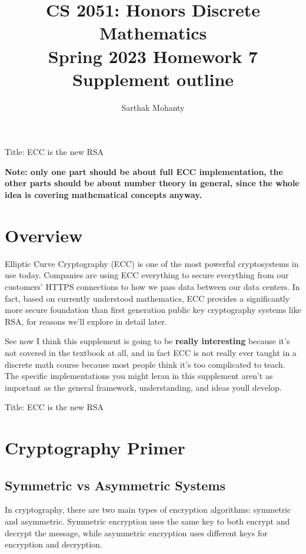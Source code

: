 \documentclass{article}
\title{\vspace{-1cm}CS 2051: Honors Discrete Mathematics \\Spring 2023 Homework 7 Supplement outline}
\author{Sarthak Mohanty }
\date{}
\begin{document}
\maketitle


Title: ECC is the new RSA

\textbf{Note: only one part should be about full ECC implementation, the other parts should be about number theory in general, since the whole idea is covering mathematical concepts anyway.}

\section*{Overview}

Elliptic Curve Cryptography (ECC) is one of the most powerful cryptosystems in use today. Companies are using ECC everything to secure everything from our customers' HTTPS connections to how we pass data between our data centers. In fact, based on currently understood mathematics, ECC provides a significantly more secure foundation than first generation public key cryptography systems like RSA, for reasons we'll explore in detail later.

\vspace{2mm}
See now I think this supplement is going to be \textbf{really interesting} because it's not covered in the textbook at all, and in fact ECC is not really ever taught in a discrete math course because most people think it's too complicated to teach. The specific implementations you might leran in this supplement aren't as important as the general framework, understanding, and ideas youll develop.


Title: ECC is the new RSA


\section*{Cryptography Primer}


\subsection*{Symmetric vs Asymmetric Systems}


In cryptography, there are two main types of encryption algorithms: symmetric and asymmetric. Symmetric encryption uses the same key to both encrypt and decrypt the message, while asymmetric encryption uses different keys for encryption and decryption.
\end{document}
